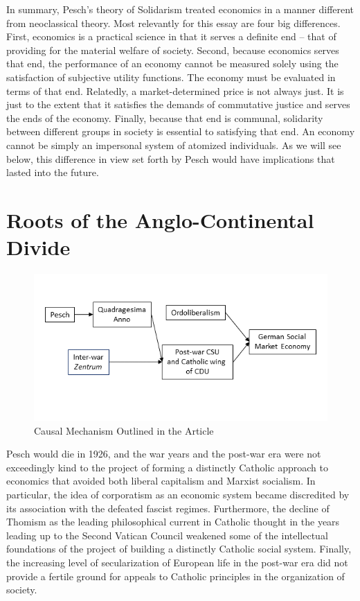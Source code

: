 \documentclass{article}
\begin{document}
In summary, Pesch’s theory of Solidarism treated economics in a manner different from neoclassical theory.  Most relevantly for this essay are four big differences.  First, economics is a practical science in that it serves a definite end – that of providing for the material welfare of society.  Second, because economics serves that end, the performance of an economy cannot be measured solely using the satisfaction of subjective utility functions.  The economy must be evaluated in terms of that end.  Relatedly, a market-determined price is not always just.  It is just to the extent that it satisfies the demands of commutative justice and serves the ends of the economy.  Finally, because that end is communal, solidarity between different groups in society is essential to satisfying that end.  An economy cannot be simply an impersonal system of atomized individuals.  As we will see below, this difference in view set forth by Pesch would have implications that lasted into the future.

\section{Roots of the Anglo-Continental Divide}

\begin{figure}
    \centering
    \includegraphics{Figure1.png}
    \caption{Causal Mechanism Outlined in the Article}
    \label{fig:causalmechanism}
\end{figure}

Pesch would die in 1926, and the war years and the post-war era were not exceedingly kind to the project of forming a distinctly Catholic approach to economics that avoided both liberal capitalism and Marxist socialism.  In particular, the idea of corporatism as an economic system became discredited by its association with the defeated fascist regimes.  Furthermore, the decline of Thomism as the leading philosophical current in Catholic thought in the years leading up to the Second Vatican Council weakened some of the intellectual foundations of the project of building a distinctly Catholic social system.  Finally, the increasing level of secularization of European life in the post-war era did not provide a fertile ground for appeals to Catholic principles in the organization of society.\citep{almodovarteixeira2008}\medskip
\end{document}
